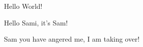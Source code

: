 \documentclass[10pt,a4paper]{article}
\begin{document}
Hello World!

Hello Sami, it's Sam! 

Sam you have angered me, I am taking over!
\end{document}
